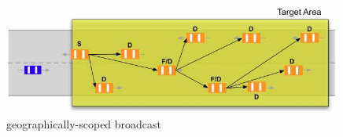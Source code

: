 \begin{figure}
\includegraphics[width=0.99\textwidth]{content/images/03_networklayer/GSB.jpg}
\caption{geographically-scoped broadcast \cite{etsi102636-1}}
\label{fig:gsb}
\end{figure}
